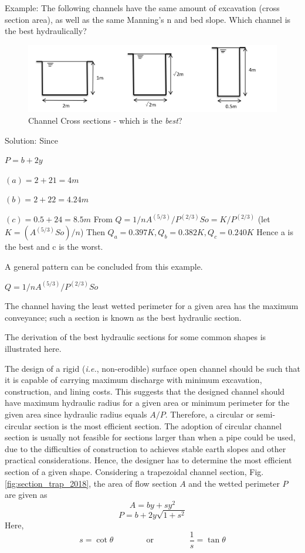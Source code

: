 \documentclass[a4paper, 12pt, british]{article} %
\numberwithin{equation}{section}
\numberwithin{figure}{section}
\numberwithin{table}{section}
\begin{document}
Example: The following channels have the same amount of excavation (cross section area), as well as the same Manning’s n and bed slope. Which channel is the best hydraulically?

\begin{figure}[H]
	\centering
	\includegraphics[scale=0.5]{./images/fig_best_sections.png}
	\caption{Channel Cross sections - which is the \textit{best}?}
	\label{fig:best_sections}
\end{figure}

Solution: 
Since

$P=b+2y$

$(a)=2+2 1=4m$

$(b)=2+2 2=4.24m$

$(c)=0.5+2 4=8.5m$
From
$Q=1/n A^(5/3)/P^(2/3) So=K/P^(2/3)$ (let $K=(A^(5/3)So)/n$)
Then
$Q_a=0.397K,Q_b=0.382K,Q_c=0.240K$
Hence a is the best and c is the worst.

A general pattern can be concluded from this example.

$Q=1/nA^(5/3)/P^(2/3) So$

The channel having the least wetted perimeter for a given area has the maximum conveyance; such a section is known as the best hydraulic section.

The derivation of the best hydraulic sections for some common shapes is illustrated here.


The design of a rigid (\emph{i.e.}, non-erodible) surface
open channel should be such that it is capable of carrying
maximum discharge with minimum excavation, construction, and
lining costs. This suggests that the designed
channel should have maximum hydraulic radius for a given
area or minimum perimeter for the given area since hydraulic
radius equals $A/P$. Therefore, a circular or semi-circular
section is the most efficient section. The adoption of
circular channel section is usually not feasible for sections larger than when a pipe could be used, due to the
difficulties of construction to achieves stable earth slopes
and other practical considerations. Hence, the designer has
to determine the most efficient section of a given shape. 
Considering a trapezoidal channel section, Fig. \ref{fig:section_trap_2018}, the
area of flow section $A$ and the wetted perimeter $P$ are given as
\begin{equation}
A = by + sy^2
\label{eq:1281}
\end{equation}
\begin{equation}
P = b +2y \sqrt{1 + s^2}
\label{eq:1282}
\end{equation}
Here,
\begin{equation*}
s = \cot \theta \qquad \qquad \text{or }  \qquad \qquad \frac{1}{s}= \tan\theta
\end{equation*}
\end{document}

